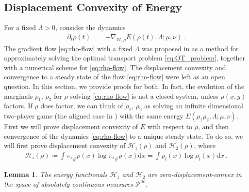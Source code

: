\documentclass[11pt,a4paper,final]{article}
\def\Hc{\mathcal H}
\def\P{\mathcal P}
\newcommand{\Wass}{\mathscr{W}}
\renewcommand{\d}{\mathrm{d}}
\newcommand{\1}{\mathbf{1}}
\theoremstyle{plain}
\newtheorem{lemma}[theorem]{Lemma}
\numberwithin{equation}{section}
\numberwithin{theorem}{section}
\begin{document}
\subsection{Displacement Convexity of Energy}\label{subsec:convexity}
For a fixed $\Lambda>0$, consider the dynamics
\begin{align}\label{eq:rho-flow}
    \partial_t \rho(t) &= -\nabla_{\Wass,\rho} E(\rho(t),\Lambda;\mu,\nu)\,.  
\end{align}
The gradient flow \eqref{eq:rho-flow} with a fixed $\Lambda$ was proposed in \cite{liu_approximating_2021} as a method for approximately solving the optimal transport problem \eqref{eq:OT_problem}, together with a numerical scheme for \eqref{eq:rho-flow}. The displacement convexity and convergence to a steady state of the flow \eqref{eq:rho-flow} were left as an open question. 
In this section, we provide proofs for both. 
 In fact, the evolution of the marginals $\rho_1$, $\rho_2$ for $\rho$ solving \eqref{eq:rho-flow} is not a closed system, unless $\rho(x,y)$ factors. If $\rho$ does factor, we can think of $\rho_1$, $\rho_2$ as solving an infinite dimensional two-player game (the aligned case in \cite{conger_coupled_2024}) with the same energy $E(\rho_1\rho_2,\Lambda;\mu,\nu)$. 
First we will prove displacement convexity of $E$ with respect to $\rho$, and then convergence of the dynamics \eqref{eq:rho-flow} to a unique steady state. To do so, we will first prove displacement convexity of $\Hc_1(\rho)$ and $\Hc_2(\rho)$, where 
\begin{align*}
    \Hc_i(\rho) \coloneqq \int {\pi_i}_\#\rho(x) \log {\pi_i}_\#\rho(x) \d x
    =  \int \rho_i(x) \log \rho_i(x) \d x\,.
\end{align*}
\begin{lemma}\label{lem:entropy_displ_cvx}
    The energy functionals $\Hc_1 $ and $\Hc_2$ are zero-displacement-convex in the space of absolutely continuous measures $\P^{ac}$.
\end{lemma}
\end{document}
